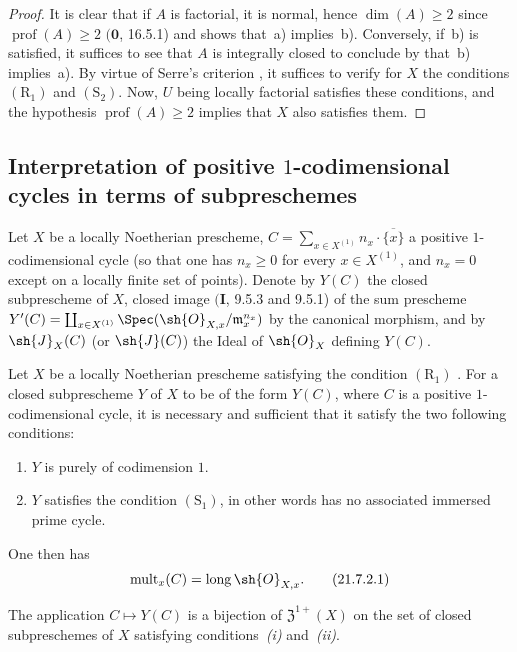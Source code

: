 \begin{proof}
It is clear that if $A$ is factorial, it is normal, hence $\dim(A)\geq 2$ since $\operatorname{prof}(A)\geq 2$ $(\mathbf{0}$, 16.5.1) and  shows that~a) implies~b).
Conversely, if~b) is satisfied, it suffices to see that $A$ is integrally closed to conclude by  that~b) implies~a).
By virtue of Serre's criterion , it suffices to verify for $X$ the conditions $(\mathrm{R}_1)$ and $(\mathrm{S}_2)$.
Now, $U$ being locally factorial satisfies these conditions, and the hypothesis $\operatorname{prof}(A)\geq 2$ implies that $X$ also satisfies them.
\end{proof}

\subsection{Interpretation of positive $1$-codimensional cycles in terms of subpreschemes}
\label{IV.21.7}


\begin{env}[21.7.1]
\label{IV.21.7.1}
Let $X$ be a locally Noetherian prescheme, $C=\sum_{x\in X^{(1)}}n_x\cdot\overline{\{x\}}$ a positive $1$-codimensional cycle (so that one has $n_x\geq 0$ for every $x\in X^{(1)}$, and $n_x=0$ except on a locally finite set of points).
Denote by $Y(C)$ the closed subprescheme of $X$, closed image $(\mathbf{I}$, 9.5.3 and 9.5.1) of the sum prescheme $Y'(C)=\coprod_{x\in X^{(1)}}\Spec(\sh{O}_{X,x}/\mathfrak{m}_x^{n_x})$ by the canonical morphism, and by $\sh{J}_X(C)$ (or $\sh{J}(C)$) the Ideal of $\sh{O}_X$ defining $Y(C)$.
\end{env}

\begin{proposition}[21.7.2]
\label{IV.21.7.2}
Let $X$ be a locally Noetherian prescheme satisfying the condition $(\mathrm{R}_1)$ .
For a closed subprescheme $Y$ of $X$ to be of the form $Y(C)$, where $C$ is a positive $1$-codimensional cycle, it is necessary and sufficient that it satisfy the two following conditions:
\begin{enumerate}[label=\emph{(\roman*)}]
  \item $Y$ is purely of codimension $1$.
  \item $Y$ satisfies the condition $(\mathrm{S}_1)$, in other words  has no associated immersed prime cycle.
\end{enumerate}
One then has
\[
\label{IV.21.7.2.1}
  \operatorname{mult}_x(C)=\operatorname{long}\sh{O}_{X,x}.
  \tag{21.7.2.1}
\]

The application $C\mapsto Y(C)$ is a bijection of $\mathfrak{Z}^{1+}(X)$ on the set of closed subpreschemes of $X$ satisfying conditions~\emph{(i)} and~\emph{(ii)}.
\end{proposition}

